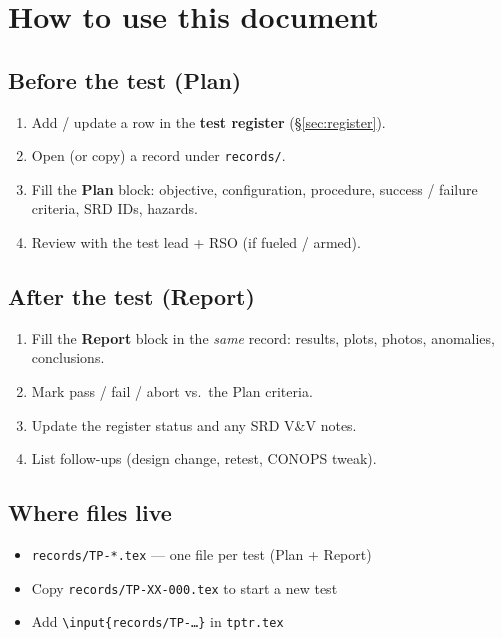 \section{How to use this document}


\subsection{Before the test (Plan)}

\begin{enumerate}[leftmargin=*]
  \item Add / update a row in the \textbf{test register} (\S\ref{sec:register}).
  \item Open (or copy) a record under \texttt{records/}.
  \item Fill the \textbf{Plan} block: objective, configuration, procedure,
    success / failure criteria, SRD IDs, hazards.
  \item Review with the test lead + RSO (if fueled / armed).
\end{enumerate}

\subsection{After the test (Report)}

\begin{enumerate}[leftmargin=*]
  \item Fill the \textbf{Report} block in the \emph{same} record: results,
    plots, photos, anomalies, conclusions.
  \item Mark pass / fail / abort vs.\ the Plan criteria.
  \item Update the register status and any SRD V\&V notes.
  \item List follow-ups (design change, retest, CONOPS tweak).
\end{enumerate}

\subsection{Where files live}

\begin{itemize}
  \item \texttt{records/TP-*.tex} --- one file per test (Plan + Report)
  \item Copy \texttt{records/TP-XX-000.tex} to start a new test
  \item Add \texttt{\textbackslash input\{records/TP-\ldots\}} in \texttt{tptr.tex}
\end{itemize}
